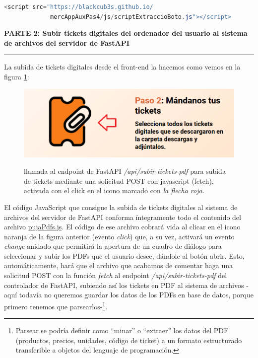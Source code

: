 \documentclass[a4paper,12pt]{report}
\begin{document}
	\begin{lstlisting}[language=java, basicstyle=\ttfamily\small]
<script src="https://blackcub3s.github.io/
             mercAppAuxPas4/js/scriptExtraccioBoto.js"></script>
	\end{lstlisting}
	
	


	\noindent \textbf{PARTE 2: Subir tickets digitales del ordenador del usuario al sistema de archivos del servidor de FastAPI}
	\hrule
	\vspace{.5em}
	
	
	
	
	
	La subida de tickets digitales desde el front-end la hacemos como vemos en la figura \ref{fig:pujarticketspas5}:
	
	\FloatBarrier
	\begin{figure}[H]
		\centering
		\caption{llamada al endpoint de FastAPI \textit{/api/subir-tickets-pdf} para subida de tickets mediante una solicitud POST con javascript (fetch), activada con el click en el icono marcado con \textit{la flecha roja}.}
		\includegraphics[width=1\linewidth]{img/pujarTicketsPas5}
		\label{fig:pujarticketspas5}
	\end{figure}
	\FloatBarrier
	
	 El código JavaScript que consigue la subida de tickets digitales al sistema de archivos del servidor de FastAPI conforma íntegramente todo el contenido del archivo \href{https://github.com/blackcub3s/mercApp/blob/main/APP%20WEB/__frontend__produccio__/app/js/pas4/pujaPdfs.js}{pujaPdfs.js}. El código de ese archivo cobrará vida al clicar en el icono naranja de la figura anterior (evento \textit{click}) que, a su vez, activará un evento \textit{change} anidado que permitirá la apertura de un cuadro de diálogo para seleccionar y subir los PDFs que el usuario desee, dándole al botón abrir. Esto, automáticamente, hará que el archivo que acabamos de comentar haga una solicitud POST con la función \textit{fetch} al endpoint \textit{/api/subir-tickets-pdf} del controlador de FastAPI, subiendo así los tickets en PDF al sistema de archivos -aquí todavía no queremos guardar los datos de los PDFs en base de datos, porque primero tenemos que parsearlos-\footnote{Parsear se podría definir como ``minar'' o ``extraer'' los datos del PDF (productos, precios, unidades, código de ticket) a un formato estructurado transferible a objetos del lenguaje de programación.}.
	
\end{document}
